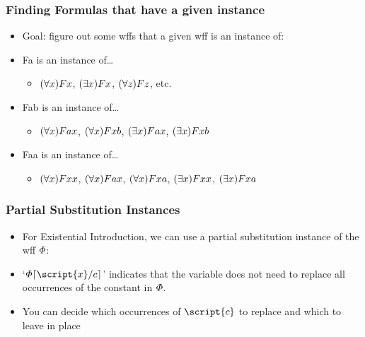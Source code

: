 \begin{frame}
\frametitle{Finding Formulas that have a given instance}

\begin{itemize}[<+->]

\item Goal: figure out some wffs that a given wff is an instance of:

\item Fa is an instance of\dots

\begin{itemize}

\item $(\forall x) Fx$, $(\exists x) Fx$, $(\forall z) Fz$, etc. 

\end{itemize}

\bigskip

\item Fab is an instance of\dots

\begin{itemize}

\item   $(\forall x) Fax$, $(\forall x) Fxb$, $(\exists x) Fax$, $(\exists x) Fxb$

\end{itemize}

\bigskip

\item Faa is an instance of\dots

\begin{itemize}

\item   $(\forall x) Fxx$, $(\forall x) Fax$, $(\forall x) Fxa$, $(\exists x) Fxx$, $(\exists x) Fxa$

\end{itemize}


\end{itemize}
\end{frame}



\begin{frame}
\frametitle{Partial Substitution Instances}

\begin{itemize}[<+->]

\item For Existential Introduction, we can use a partial substitution instance of the wff $\varPhi{}$:

\item `$\metaA{}\substitutesome{c}{\script{x}}$' indicates that  the variable  does not need to replace all occurrences of the constant  in $\varPhi{}$. 

\item You can decide which occurrences of $\script{c}$ to replace and which to leave in place

\end{itemize}
\end{frame}

